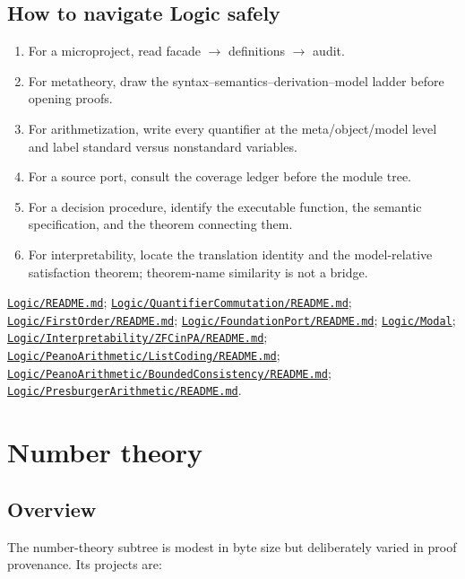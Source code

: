 \documentclass[
  10pt,
  a4paper,
  twoside,
  open=any,
  parskip=half,
  headings=big
]{scrreprt}
\newcommand{\CommitFull}{675d0a2ff0fc624fba199e006049016ba806f40a}
\newcommand{\RepoBlobBase}{https://github.com/VladimirReshetnikov/ProveIt/blob/\CommitFull/}
\newcommand{\RepoTreeBase}{https://github.com/VladimirReshetnikov/ProveIt/tree/\CommitFull/}
\newcommand{\RepoFile}[1]{%
  \href{\RepoBlobBase\detokenize{#1}}{\nolinkurl{#1}}}
\newcommand{\RepoDir}[1]{%
  \href{\RepoTreeBase\detokenize{#1}}{\nolinkurl{#1}}}
\begin{document}
\section{How to navigate Logic safely}

\begin{readingbox}
\begin{enumerate}
  \item For a microproject, read facade $\to$ definitions $\to$ audit.
  \item For metatheory, draw the syntax--semantics--derivation--model ladder
        before opening proofs.
  \item For arithmetization, write every quantifier at the meta/object/model
        level and label standard versus nonstandard variables.
  \item For a source port, consult the coverage ledger before the module tree.
  \item For a decision procedure, identify the executable function, the
        semantic specification, and the theorem connecting them.
  \item For interpretability, locate the translation identity and the
        model-relative satisfaction theorem; theorem-name similarity is not a
        bridge.
\end{enumerate}
\end{readingbox}

\begin{sourcebox}
\RepoFile{Logic/README.md};
\RepoFile{Logic/QuantifierCommutation/README.md};
\RepoFile{Logic/FirstOrder/README.md};
\RepoFile{Logic/FoundationPort/README.md};
\RepoDir{Logic/Modal};
\RepoFile{Logic/Interpretability/ZFCinPA/README.md};
\RepoFile{Logic/PeanoArithmetic/ListCoding/README.md};
\RepoFile{Logic/PeanoArithmetic/BoundedConsistency/README.md};
\RepoFile{Logic/PresburgerArithmetic/README.md}.
\end{sourcebox}

\chapter{Number theory}
\label{chap:number-theory}

\section{Overview}

The number-theory subtree is modest in byte size but deliberately varied in
proof provenance.  Its projects are:
\end{document}
